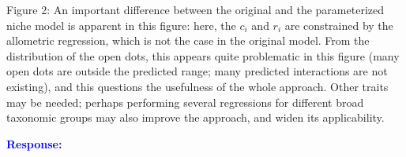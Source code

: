 \documentclass [12pt,onecolumn,twoside,openright]{report}
\begin{document}
\begin{onehalfspacing}
\medskip Figure 2: An important difference between the
original and the parameterized niche model is apparent in this figure: here, the
$c_i$ and $r_i$ are constrained by the allometric regression, which is not the
case in the original model. From the distribution of the open dots, this appears
quite problematic in this figure (many open dots are outside the predicted
range; many predicted interactions are not existing), and this questions the
usefulness of the whole approach. Other traits may be needed; perhaps performing
several regressions for different broad taxonomic groups may also improve the
approach, and widen its applicability.

\textcolor{blue}{\textbf{Response:}} \textit{\textcolor{blue}{}}




\end{onehalfspacing}
\end{document}
